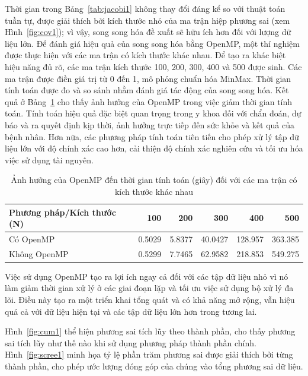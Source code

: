 Thời gian trong Bảng~\ref{tab:jacobi1} không thay đổi đáng kể so với thuật toán tuần tự, được giải thích bởi kích thước nhỏ của ma trận hiệp phương sai (xem Hình~\ref{fig:cov1}); vì vậy, song song hóa đề xuất sẽ hữu ích hơn đối với lượng dữ liệu lớn. Để đánh giá hiệu quả của song song hóa bằng OpenMP, một thí nghiệm được thực hiện với các ma trận có kích thước khác nhau. Để tạo ra khác biệt hiệu năng đủ rõ, các ma trận kích thước 100, 200, 300, 400 và 500 được sinh. Các ma trận được điền giá trị từ 0 đến 1, mô phỏng chuẩn hóa MinMax. Thời gian tính toán được đo và so sánh nhằm đánh giá tác động của song song hóa. Kết quả ở Bảng~\ref{tab:openmp} cho thấy ảnh hưởng của OpenMP trong việc giảm thời gian tính toán. Tính toán hiệu quả đặc biệt quan trọng trong y khoa đối với chẩn đoán, dự báo và ra quyết định kịp thời, ảnh hưởng trực tiếp đến sức khỏe và kết quả của bệnh nhân. Hơn nữa, các phương pháp tính toán tiên tiến cho phép xử lý tập dữ liệu lớn với độ chính xác cao hơn, cải thiện độ chính xác nghiên cứu và tối ưu hóa việc sử dụng tài nguyên.


\begin{table}[H]
\centering
\caption{Ảnh hưởng của OpenMP đến thời gian tính toán (giây) đối với các ma trận có kích thước khác nhau}\label{tab:openmp}
\begin{tabular}{lrrrrr}
\toprule
\textbf{Phương pháp/Kích thước (N)} & 100 & 200 & 300 & 400 & 500\\
\midrule
Có OpenMP & 0.5029 & 5.8377 & 40.0427 & 128.957 & 363.385\\
Không OpenMP & 0.5299 & 7.7465 & 62.9582 & 218.853 & 549.275\\
\bottomrule
\end{tabular}
\end{table}

Việc sử dụng OpenMP tạo ra lợi ích ngay cả đối với các tập dữ liệu nhỏ vì nó làm giảm thời gian xử lý ở các giai đoạn lặp và tối ưu việc sử dụng bộ xử lý đa lõi. Điều này tạo ra một triển khai tổng quát và có khả năng mở rộng, vẫn hiệu quả cả với dữ liệu hiện tại và các tập dữ liệu lớn hơn trong tương lai.

Hình~\ref{fig:cum1} thể hiện phương sai tích lũy theo thành phần, cho thấy phương sai tích lũy như thế nào khi sử dụng phương pháp thành phần chính. Hình~\ref{fig:scree1} minh họa tỷ lệ phần trăm phương sai được giải thích bởi từng thành phần, cho phép ước lượng đóng góp của chúng vào tổng phương sai dữ liệu.

